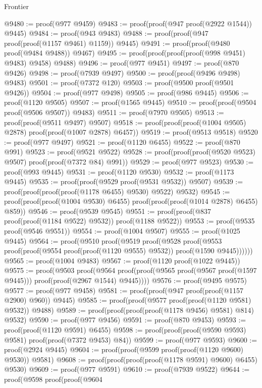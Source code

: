 \begin{lexlean}{Frontier}
\begin{coremodule}
@9480 := proof(@977 @9459)
@9483 := proof(proof(@947 proof(@2922 @1544)) @9445)
@9484 := proof(@943 @9483)
@9488 := proof(proof(@947 proof(proof(@1157 @9461) @1159)) @9445)
@9491 := proof(proof(@9480 proof(@9484 @9488)) @9467)
@9495 := proof(proof(proof(proof(@998 @9451) @9483) @9458) @9488)
@9496 := proof(@977 @9451)
@9497 := proof(@870 @9426)
@9498 := proof(@7939 @9497)
@9500 := proof(proof(@9496 @9498) @9483)
@9501 := proof(@7372 @120)
@9503 := proof(@9500 proof(@9501 @9426))
@9504 := proof(@977 @9498)
@9505 := proof(@986 @9445)
@9506 := proof(@1120 @9505)
@9507 := proof(@1565 @9445)
@9510 := proof(proof(@9504 proof(@9506 @9507)) @9483)
@9511 := proof(@7970 @9505)
@9513 := proof(proof(@9511 @9497) @9507)
@9518 := proof(proof(proof(@1004 @9505) @2878) proof(proof(@1007 @2878) @6457))
@9519 := proof(@9513 @9518)
@9520 := proof(@977 @9497)
@9521 := proof(@1120 @6455)
@9522 := proof(@870 @991)
@9523 := proof(@9521 @9522)
@9528 := proof(proof(proof(@9520 @9523) @9507) proof(proof(@7372 @84) @991))
@9529 := proof(@977 @9523)
@9530 := proof(@993 @9445)
@9531 := proof(@1120 @9530)
@9532 := proof(@1173 @9445)
@9535 := proof(proof(@9529 proof(@9531 @9532)) @9507)
@9539 := proof(proof(proof(proof(@1178 @6455) @9530) @9522) @9532)
@9545 := proof(proof(proof(@1004 @9530) @6455) proof(proof(proof(@1014 @2878) @6455) @859))
@9546 := proof(@9539 @9545)
@9551 := proof(proof(@837 proof(proof(@1184 @9522) @9532)) proof(@1188 @9522))
@9553 := proof(@9535 proof(@9546 @9551))
@9554 := proof(@1004 @9507)
@9555 := proof(@1025 @9445)
@9564 := proof(@9510
      proof(@9519
          proof(@9528
              proof(@9553 proof(proof(@9554 proof(proof(@1120 @9555) @9532)) proof(@1590 @9445))))))
@9565 := proof(@1004 @9483)
@9567 := proof(@1120 proof(@1022 @9445))
@9575 := proof(@9503
      proof(@9564
          proof(proof(@9565 proof(@9567 proof(@1597 @9445))) proof(proof(@2967 @1544) @9445))))
@9576 := proof(@9495 @9575)
@9577 := proof(@977 @9458)
@9581 := proof(proof(@947 proof(proof(@1157 @2900) @960)) @9445)
@9585 := proof(proof(@9577 proof(proof(@1120 @9581) @9532)) @9488)
@9589 := proof(proof(proof(proof(@1178 @9456) @9581) @814) @9532)
@9590 := proof(@977 @9456)
@9591 := proof(@870 @9453)
@9593 := proof(proof(@1120 @9591) @6455)
@9598 := proof(proof(proof(@9590 @9593) @9581) proof(proof(@7372 @9453) @84))
@9599 := proof(@977 @9593)
@9600 := proof(@2924 @9445)
@9604 := proof(proof(@9599 proof(proof(@1120 @9600) @9530)) @9581)
@9608 := proof(proof(proof(proof(@1178 @9591) @9600) @6455) @9530)
@9609 := proof(@977 @9591)
@9610 := proof(@7939 @9522)
@9644 := proof(@9598
      proof(proof(@9604

\end{coremodule}
\end{lexlean}
